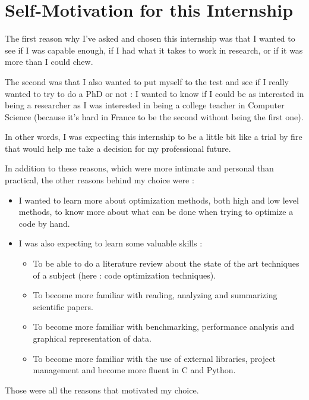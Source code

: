 \documentclass[paper=a4, fontsize=11.5pt]{scrartcl}
\numberwithin{equation}{section}        %
\numberwithin{figure}{section}          %
\numberwithin{table}{section}               %
\begin{document}
\section{Self-Motivation for this Internship}
The first reason why I've asked and chosen this internship was that I wanted to see
if I was capable enough, if I had what it takes to work in research, or if it was more than I could
chew.

The second was that I also wanted to put myself to the test and see if I really 
wanted to try to do a PhD or not : I wanted to know if I could be as interested in being
a researcher as I was interested in being a college teacher in Computer Science
(because it's hard in France to be the second without being the first one).

In other words,
I was expecting this internship to be a little bit like a trial by fire that would help me
take a decision for my professional future.

\bigskip

In addition to these reasons, which were more intimate and personal than practical, the
other reasons behind my choice were :
\begin{itemize}
    \item[] I wanted to learn more about optimization methods, both high and low level methods,
        to know more about what can be done when trying to optimize a code by hand.
    \item[] I was also expecting to learn some valuable skills :
        \begin{itemize}
            \item To be able to do a literature review about the state of the art techniques of
                a subject (here : code optimization techniques).
            \item To become more familiar with reading, analyzing and summarizing scientific papers.
            \item To become more familiar with benchmarking, performance analysis and
                graphical representation of data.
            \item To become more familiar with the use of external libraries, project
                management and become more fluent in C and Python.
        \end{itemize}
\end{itemize}

\bigskip

Those were all the reasons that motivated my choice.
\end{document}
